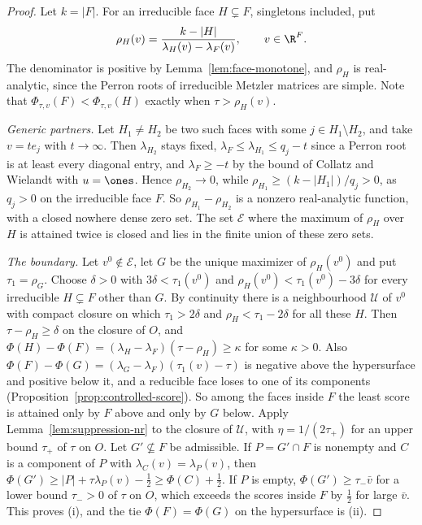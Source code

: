 \begin{proof}
Let $k=|F|$. For an irreducible face $H\subsetneq F$, singletons included, put
\[
 \rho_H(v)=\frac{k-|H|}{\lambda_H(v)-\lambda_F(v)},\qquad v\in\R^F .
\]
The denominator is positive by Lemma~\ref{lem:face-monotone}, and $\rho_H$ is
real-analytic, since the Perron roots of irreducible Metzler matrices are
simple. Note that $\Phi_{\tau,v}(F)<\Phi_{\tau,v}(H)$ exactly when $\tau>\rho_H(v)$.

\emph{Generic partners.} Let $H_1\ne H_2$ be two such faces with some $j\in
H_1\setminus H_2$, and take $v=te_j$ with $t\to\infty$. Then $\lambda_{H_2}$
stays fixed, $\lambda_F\le\lambda_{H_1}\le q_j-t$ since a Perron root is at
least every diagonal entry, and $\lambda_F\ge-t$ by the bound of Collatz and
Wielandt with $u=\ones$. Hence $\rho_{H_2}\to0$, while
$\rho_{H_1}\ge(k-|H_1|)/q_j>0$, as $q_j>0$ on the irreducible face $F$. So $\rho_{H_1}-\rho_{H_2}$ is a nonzero
real-analytic function, with a closed nowhere dense zero set. The set
$\mathcal E$ where the maximum of $\rho_H$ over $H$ is attained twice is closed
and lies in the finite union of these zero sets.

\emph{The boundary.} Let $v^0\notin\mathcal E$, let $G$ be the unique maximizer of
$\rho_H(v^0)$ and put $\tau_1=\rho_G$. Choose $\delta>0$ with
$3\delta<\tau_1(v^0)$ and $\rho_H(v^0)<\tau_1(v^0)-3\delta$ for every irreducible
$H\subsetneq F$ other than $G$. By continuity there is a neighbourhood $\mathcal U$ of
$v^0$ with compact closure on which $\tau_1>2\delta$ and $\rho_H<\tau_1-2\delta$
for all these $H$. Then $\tau-\rho_H\ge\delta$ on the closure of $O$, and
$\Phi(H)-\Phi(F)=(\lambda_H-\lambda_F)(\tau-\rho_H)\ge\kappa$ for some $\kappa>0$.
Also $\Phi(F)-\Phi(G)=(\lambda_G-\lambda_F)(\tau_1(v)-\tau)$ is negative above the
hypersurface and positive below it, and a reducible face loses to one of its
components (Proposition~\ref{prop:controlled-score}). So among the faces inside
$F$ the least score is attained only by $F$ above and only by $G$ below. Apply
Lemma~\ref{lem:suppression-nr} to the closure of $\mathcal U$, with
$\eta=1/(2\tau_+)$ for an upper bound $\tau_+$ of $\tau$ on $O$. Let
$G'\not\subseteq F$ be admissible. If $P=G'\cap F$ is nonempty and $C$ is a
component of $P$ with $\lambda_C(v)=\lambda_P(v)$, then
$\Phi(G')\ge|P|+\tau\lambda_P(v)-\frac12\ge\Phi(C)+\frac12$. If $P$ is empty,
$\Phi(G')\ge\tau_-\bar v$ for a lower bound $\tau_->0$ of $\tau$ on $O$, which
exceeds the scores inside $F$ by $\frac12$ for large $\bar v$. This proves (i),
and the tie $\Phi(F)=\Phi(G)$ on the hypersurface is (ii).


\end{proof}
